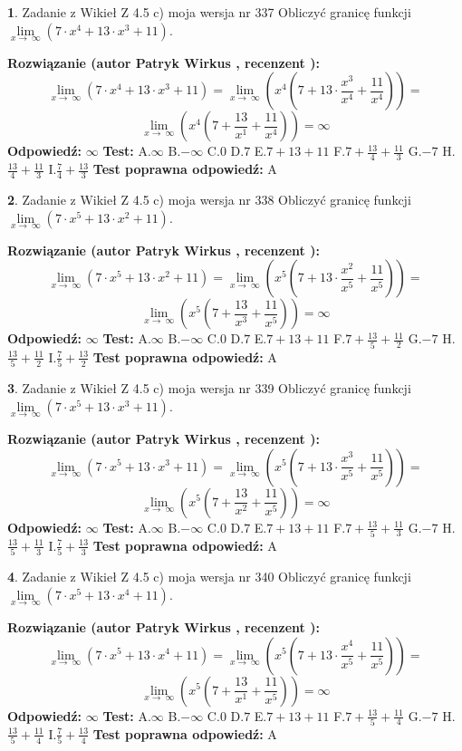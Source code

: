 \documentclass[12pt, a4paper]{article}
\theoremstyle{definition} %
\newtheorem{zad}{}
\newcommand{\zadStart}[1]{\begin{zad}#1\newline}
\newcommand{\zadStop}{\end{zad}}
\newcommand{\rozwStart}[2]{\noindent \textbf{Rozwiązanie (autor #1 , recenzent #2): }\newline}
\newcommand{\rozwStop}{\newline}
\newcommand{\odpStart}{\noindent \textbf{Odpowiedź:}\newline}
\newcommand{\odpStop}{\newline}
\newcommand{\testStart}{\noindent \textbf{Test:}\newline}
\newcommand{\testStop}{\newline}
\newcommand{\kluczStart}{\noindent \textbf{Test poprawna odpowiedź:}\newline}
\newcommand{\kluczStop}{\newline}
\begin{document}
\zadStart{Zadanie z Wikieł Z 4.5 c) moja wersja nr 337}
Obliczyć granicę funkcji  $\lim\limits_{x\to\ \infty}(7 \cdot x^{4}+13 \cdot x^{3}+11)$.
\zadStop
\rozwStart{Patryk Wirkus}{}
$$\lim\limits_{x\to\ \infty}(7 \cdot x^{4}+13 \cdot x^{3}+11) = \lim\limits_{x\to\ \infty}(x^{4}(7 +13 \cdot \frac{x^{3}}{x^{4}}+\frac{11}{x^{4}})) =$$ $$\lim\limits_{x\to\ \infty}(x^{4}(7 +\frac{13}{x^{1}}+\frac{11}{x^{4}})) =\infty$$
\rozwStop
\odpStart
$\infty$
\odpStop
\testStart
A.$\infty$ B.$-\infty$ C.$0$ D.$7$ E.$7 + 13 + 11$
F.$7+\frac{13}{4}+\frac{11}{3}$ G.$-7$
H.$\frac{13}{4}+\frac{11}{3}$
I.$\frac{7}{4}+\frac{13}{3}$
\testStop
\kluczStart
A
\kluczStop



\zadStart{Zadanie z Wikieł Z 4.5 c) moja wersja nr 338}
Obliczyć granicę funkcji  $\lim\limits_{x\to\ \infty}(7 \cdot x^{5}+13 \cdot x^{2}+11)$.
\zadStop
\rozwStart{Patryk Wirkus}{}
$$\lim\limits_{x\to\ \infty}(7 \cdot x^{5}+13 \cdot x^{2}+11) = \lim\limits_{x\to\ \infty}(x^{5}(7 +13 \cdot \frac{x^{2}}{x^{5}}+\frac{11}{x^{5}})) =$$ $$\lim\limits_{x\to\ \infty}(x^{5}(7 +\frac{13}{x^{3}}+\frac{11}{x^{5}})) =\infty$$
\rozwStop
\odpStart
$\infty$
\odpStop
\testStart
A.$\infty$ B.$-\infty$ C.$0$ D.$7$ E.$7 + 13 + 11$
F.$7+\frac{13}{5}+\frac{11}{2}$ G.$-7$
H.$\frac{13}{5}+\frac{11}{2}$
I.$\frac{7}{5}+\frac{13}{2}$
\testStop
\kluczStart
A
\kluczStop



\zadStart{Zadanie z Wikieł Z 4.5 c) moja wersja nr 339}
Obliczyć granicę funkcji  $\lim\limits_{x\to\ \infty}(7 \cdot x^{5}+13 \cdot x^{3}+11)$.
\zadStop
\rozwStart{Patryk Wirkus}{}
$$\lim\limits_{x\to\ \infty}(7 \cdot x^{5}+13 \cdot x^{3}+11) = \lim\limits_{x\to\ \infty}(x^{5}(7 +13 \cdot \frac{x^{3}}{x^{5}}+\frac{11}{x^{5}})) =$$ $$\lim\limits_{x\to\ \infty}(x^{5}(7 +\frac{13}{x^{2}}+\frac{11}{x^{5}})) =\infty$$
\rozwStop
\odpStart
$\infty$
\odpStop
\testStart
A.$\infty$ B.$-\infty$ C.$0$ D.$7$ E.$7 + 13 + 11$
F.$7+\frac{13}{5}+\frac{11}{3}$ G.$-7$
H.$\frac{13}{5}+\frac{11}{3}$
I.$\frac{7}{5}+\frac{13}{3}$
\testStop
\kluczStart
A
\kluczStop



\zadStart{Zadanie z Wikieł Z 4.5 c) moja wersja nr 340}
Obliczyć granicę funkcji  $\lim\limits_{x\to\ \infty}(7 \cdot x^{5}+13 \cdot x^{4}+11)$.
\zadStop
\rozwStart{Patryk Wirkus}{}
$$\lim\limits_{x\to\ \infty}(7 \cdot x^{5}+13 \cdot x^{4}+11) = \lim\limits_{x\to\ \infty}(x^{5}(7 +13 \cdot \frac{x^{4}}{x^{5}}+\frac{11}{x^{5}})) =$$ $$\lim\limits_{x\to\ \infty}(x^{5}(7 +\frac{13}{x^{1}}+\frac{11}{x^{5}})) =\infty$$
\rozwStop
\odpStart
$\infty$
\odpStop
\testStart
A.$\infty$ B.$-\infty$ C.$0$ D.$7$ E.$7 + 13 + 11$
F.$7+\frac{13}{5}+\frac{11}{4}$ G.$-7$
H.$\frac{13}{5}+\frac{11}{4}$
I.$\frac{7}{5}+\frac{13}{4}$
\testStop
\kluczStart
A
\kluczStop
\end{document}
